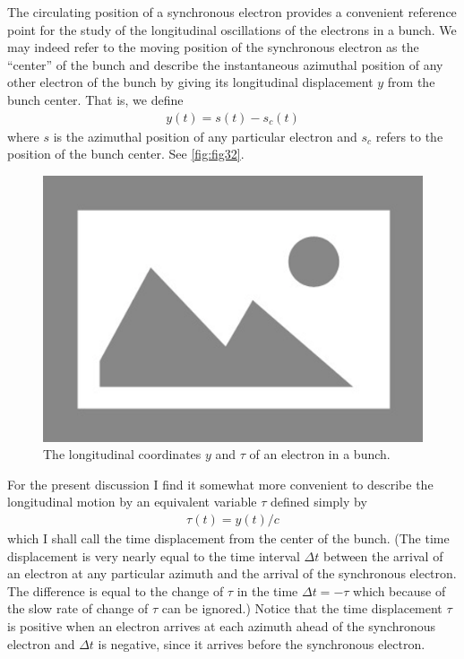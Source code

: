 The circulating position of a synchronous electron provides a convenient reference point for the study of the longitudinal oscillations of the electrons in a bunch. We may indeed refer to the moving position of the synchronous electron as the “center” of the bunch and describe the instantaneous azimuthal position of any other electron of the bunch by giving its longitudinal displacement $y$ from the bunch center. That is, we define
\begin{align}
	y(t) = s(t) - s_c(t)
\end{align}
where $s$ is the azimuthal position of any particular electron and $s_c$ refers to the position of the bunch center. See \autoref{fig:fig32}.

\begin{figure}[!htb]
	\centering
	\includegraphics[width=0.6\linewidth]{./Figuras/placeholder.png}
	\caption{The longitudinal coordinates $y$ and $\tau$ of an electron in a bunch.}
	\label{fig:fig32}
\end{figure}

For the present discussion I find it somewhat more convenient to describe the longitudinal motion by an equivalent variable $\tau$ defined simply by
\begin{align}
	\tau(t) = y(t)/c
\end{align}
which I shall call the time displacement from the center of the bunch. (The time displacement is very nearly equal to the time interval $\Delta t$ between the arrival of an electron at any particular azimuth and the arrival of the synchronous electron. The difference is equal to the change of $\tau$ in the time $\Delta t = - \tau$ which because of the slow rate of change of $\tau$ can be ignored.) Notice that the time displacement $\tau$ is positive when an electron arrives at each azimuth ahead of the synchronous electron and $\Delta t$ is negative, since it arrives before the synchronous electron.

